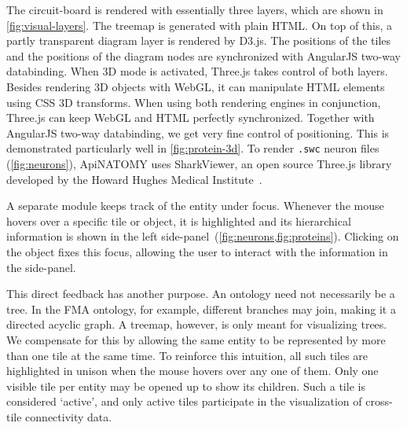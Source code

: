 
The circuit-board is rendered with essentially three layers,
which are shown in \cref{fig:visual-layers}. The treemap is generated
with plain HTML. On top of this, a partly transparent diagram layer is
rendered by D3.js. The positions of the tiles and the positions of the
diagram nodes are synchronized with AngularJS two-way databinding.
When 3D mode is activated, Three.js takes control of both layers.
Besides rendering 3D objects with WebGL, it can manipulate HTML
elements using CSS 3D transforms. When using both rendering engines
in conjunction, Three.js can keep WebGL and HTML perfectly synchronized.
Together with AngularJS two-way databinding, we get very fine control
of positioning. This is demonstrated particularly well in \cref{fig:protein-3d}.
To render \texttt{.swc} neuron files (\cref{fig:neurons}), ApiNATOMY uses SharkViewer,
an open source Three.js library
developed by the Howard Hughes Medical Institute~\cite{weaver_sharkviewer_2014}.


A separate module keeps track of the entity under focus. Whenever the mouse hovers
over a specific tile or object, it is highlighted and its hierarchical information
is shown in the left side-panel~(\cref{fig:neurons,fig:proteins}). Clicking on the object
fixes this focus, allowing the user to interact with the information in the side-panel.

This direct feedback has another purpose. An ontology need not necessarily be a
tree. In the FMA ontology, for example, different branches may join, making it a
directed acyclic graph. A treemap, however, is only meant
for visualizing trees. We compensate for this by allowing the same entity to be
represented by more than one tile at the same time. To reinforce this intuition, all
such tiles are highlighted in unison when the mouse hovers over any one of them.
Only one visible tile per entity may be opened up to show its children.
Such a tile is considered `active', and only active tiles participate in the visualization
of cross-tile connectivity data.

